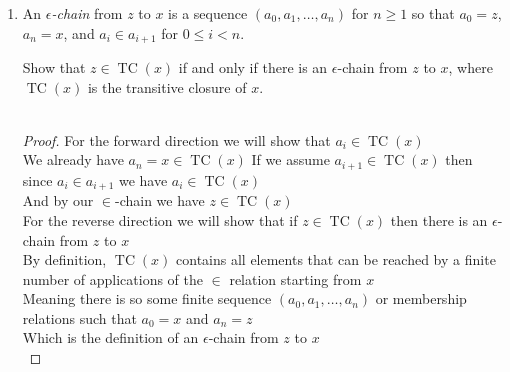 \documentclass[11pt]{amsart}
\DeclareMathOperator{\TC}{TC}
\begin{document}
\begin{enumerate}
\begin{enumerate}
\begin{proof}
Then $\alpha^{\beta \cdot S(\gamma)}=\alpha^{\beta \cdot \gamma + \beta}=\alpha^{\beta \cdot \gamma} \cdot \alpha^\beta$\\
$=(\alpha^\beta)^\gamma \cdot \alpha^\beta=(\alpha^\beta)^{S(\gamma)}$\\
Limit Case:\\
Assume $\alpha^{\beta \cdot \gamma}=(\alpha^\beta)^\gamma$ for all $\gamma < \lambda$\\
Then $\alpha^{\beta \cdot \lambda}=\sup \{ \alpha^{\beta \cdot \gamma} : \gamma < \lambda\}$\\
$=\sup \{ (\alpha^\beta)^\gamma : \gamma < \lambda\}$\\
$=(\alpha^\beta)^\lambda$\\

 \end{proof}
\vfill
\end{enumerate}

\newpage

\item An \emph{$\epsilon$-chain} from $z$ to $x$ is a sequence $(a_0,a_1,\ldots,a_n)$ for $n \geq 1$ so that $a_0=z$, $a_n=x$, and $a_i \in a_{i+1}$ for $0 \leq i < n$.

Show that $z \in \TC(x)$ if and only if there is an $\epsilon$-chain from $z$ to $x$, where $\TC(x)$ is the transitive closure of $x$.
\\
\\

\begin{proof}
 For the forward direction we will show that $a_i \in \TC(x)$\\
 We already have $a_n = x \in \TC(x)$
 If we assume $a_{i+1} \in \TC(x)$ then since $a_i \in a_{i+1}$ we have $a_i \in \TC(x)$\\
 And by our $\in$-chain we have $z \in \TC(x)$\\
 For the reverse direction we will show that if $z \in \TC(x)$ then there is an $\epsilon$-chain from $z$ to $x$\\
 By definition, $\TC(x)$ contains all elements that can be reached by a finite number of applications of the $\in$ relation starting from $x$\\
 Meaning there is so some finite sequence $(a_0, a_1, \dots , a_n)$ or membership relations such that $a_0 = x$ and $a_n = z$\\
 Which is the definition of an $\epsilon$-chain from $z$ to $x$\\
 \end{proof}


\end{enumerate}
\end{document}
